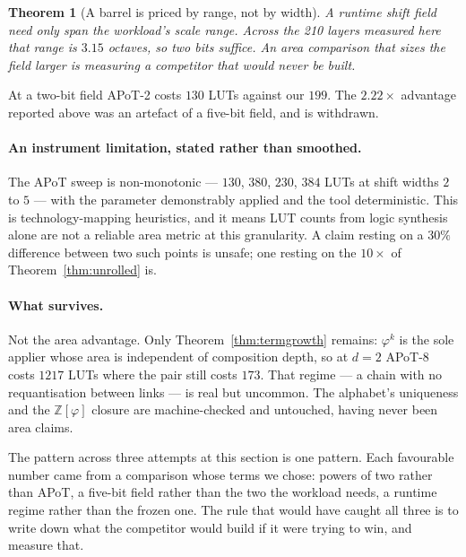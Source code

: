 \documentclass[11pt]{article}
\newtheorem{theorem}{Theorem}
\theoremstyle{definition}
\begin{document}
\begin{theorem}[A barrel is priced by range, not by width]
\label{thm:barrelrange}
A runtime shift field need only span the workload's scale range. Across the 210
layers measured here that range is $3.15$ octaves, so two bits suffice. An area
comparison that sizes the field larger is measuring a competitor that would never
be built.
\end{theorem}

At a two-bit field APoT-2 costs $130$ LUTs against our $199$. The $2.22\times$
advantage reported above was an artefact of a five-bit field, and is withdrawn.

\paragraph{An instrument limitation, stated rather than smoothed.} The APoT sweep
is non-monotonic --- $130$, $380$, $230$, $384$ LUTs at shift widths $2$ to $5$
--- with the parameter demonstrably applied and the tool deterministic. This is
technology-mapping heuristics, and it means LUT counts from logic synthesis alone
are not a reliable area metric at this granularity. A claim resting on a $30\%$
difference between two such points is unsafe; one resting on the $10\times$ of
Theorem~\ref{thm:unrolled} is.

\paragraph{What survives.} Not the area advantage. Only
Theorem~\ref{thm:termgrowth} remains: $\varphi^{k}$ is the sole applier whose
area is independent of composition depth, so at $d=2$ APoT-8 costs $1217$ LUTs
where the pair still costs $173$. That regime --- a chain with no requantisation
between links --- is real but uncommon. The alphabet's uniqueness and the
$\mathbb{Z}[\varphi]$ closure are machine-checked and untouched, having never
been area claims.

The pattern across three attempts at this section is one pattern. Each favourable
number came from a comparison whose terms we chose: powers of two rather than
APoT, a five-bit field rather than the two the workload needs, a runtime regime
rather than the frozen one. The rule that would have caught all three is to write
down what the competitor would build if it were trying to win, and measure that.
\end{document}
